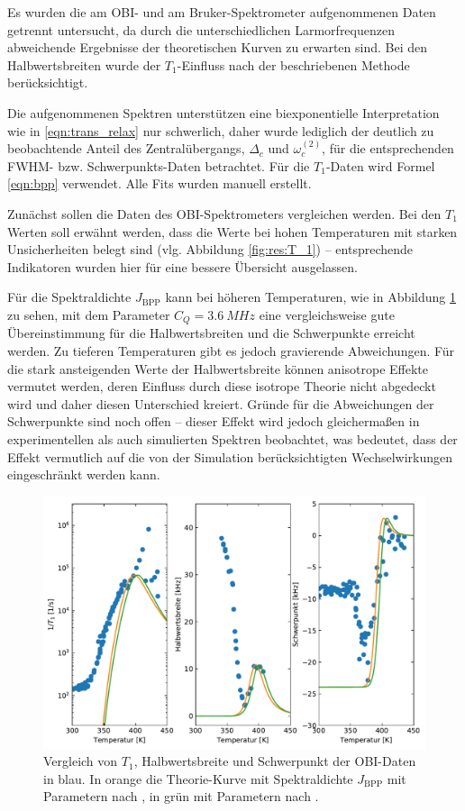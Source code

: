 Es wurden die am OBI- und am Bruker-Spektrometer aufgenommenen Daten getrennt untersucht, da durch die unterschiedlichen Larmorfrequenzen abweichende Ergebnisse der theoretischen Kurven zu erwarten sind. Bei den Halbwertsbreiten wurde der $T_1$-Einfluss nach der beschriebenen Methode berücksichtigt.



Die aufgenommenen Spektren unterstützen eine biexponentielle Interpretation wie in \eqref{eqn:trans_relax} nur schwerlich, daher wurde lediglich der deutlich zu beobachtende Anteil des Zentralübergangs, $\Delta_c$ und $\omega_c^{(2)}$, für die entsprechenden FWHM- bzw. Schwerpunkts-Daten betrachtet. Für die $T_1$-Daten wird Formel \eqref{eqn:bpp} verwendet. Alle Fits wurden manuell erstellt.



Zunächst sollen die Daten des OBI-Spektrometers vergleichen werden. Bei den $T_1$ Werten soll erwähnt werden, dass die Werte bei hohen Temperaturen mit starken Unsicherheiten belegt sind (vlg. Abbildung \ref{fig:res:T_1}) -- entsprechende Indikatoren wurden hier für eine bessere Übersicht ausgelassen.

Für die Spektraldichte $J_\text{BPP}$ kann bei höheren Temperaturen, wie in Abbildung \ref{fig:res:theorie_j} zu sehen, mit dem Parameter $C_Q = \SI{3.6}{MHz}$ eine vergleichsweise gute Übereinstimmung für die Halbwertsbreiten und die Schwerpunkte erreicht werden. Zu tieferen Temperaturen gibt es jedoch gravierende Abweichungen. Für die stark ansteigenden Werte der Halbwertsbreite können anisotrope Effekte vermutet werden, deren Einfluss durch diese isotrope Theorie nicht abgedeckt wird und daher diesen Unterschied kreiert. Gründe für die Abweichungen der Schwerpunkte sind noch offen -- dieser Effekt wird jedoch gleichermaßen in experimentellen als auch simulierten Spektren beobachtet, was bedeutet, dass der Effekt vermutlich auf die von der Simulation berücksichtigten Wechselwirkungen eingeschränkt werden kann.
\begin{figure}
	\begin{center}
		\includegraphics[width=.9\textwidth]{graphics/plot/OBI_J_02.pdf}
	\end{center}
	\caption{Vergleich von $T_1$, Halbwertsbreite und Schwerpunkt der OBI-Daten in blau. In orange die Theorie-Kurve mit Spektraldichte $J_\text{BPP}$ mit Parametern nach \cite{PIMENOV199793}, in grün mit Parametern nach \cite{crn_augsburg}.} \label{fig:res:theorie_j}
\end{figure}

